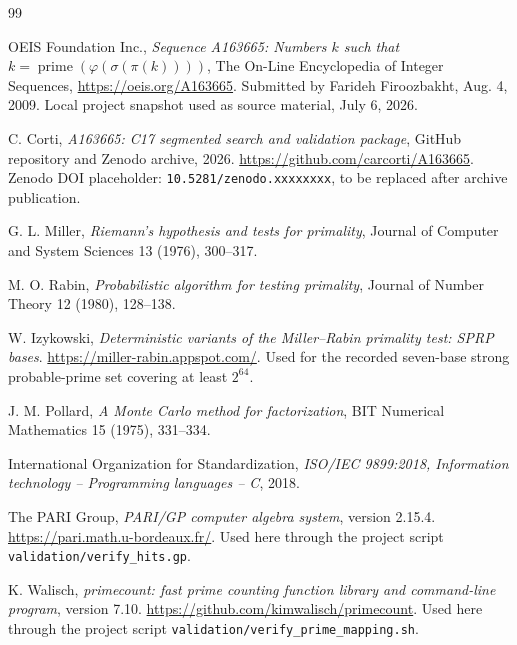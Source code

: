 \documentclass[11pt]{article}
\theoremstyle{definition}
\theoremstyle{remark}
\begin{document}
\begin{thebibliography}{99}
\sloppy
\raggedright

OEIS Foundation Inc.,
\emph{Sequence A163665: Numbers \(k\) such that
\(k=\operatorname{prime}(\varphi(\sigma(\pi(k))))\)},
The On-Line Encyclopedia of Integer Sequences,
\url{https://oeis.org/A163665}.
Submitted by Farideh Firoozbakht, Aug. 4, 2009.  Local project snapshot
used as source material, July 6, 2026.

C. Corti,
\emph{A163665: C17 segmented search and validation package},
GitHub repository and Zenodo archive, 2026.
\url{https://github.com/carcorti/A163665}.
Zenodo DOI placeholder: \texttt{10.5281/zenodo.xxxxxxxx}, to be
replaced after archive publication.

G. L. Miller,
\emph{Riemann's hypothesis and tests for primality},
Journal of Computer and System Sciences 13 (1976), 300--317.

M. O. Rabin,
\emph{Probabilistic algorithm for testing primality},
Journal of Number Theory 12 (1980), 128--138.

W. Izykowski,
\emph{Deterministic variants of the Miller--Rabin primality test:
SPRP bases}.
\url{https://miller-rabin.appspot.com/}.
Used for the recorded seven-base strong probable-prime set covering at
least \(2^{64}\).

J. M. Pollard,
\emph{A Monte Carlo method for factorization},
BIT Numerical Mathematics 15 (1975), 331--334.

International Organization for Standardization,
\emph{ISO/IEC 9899:2018, Information technology -- Programming languages -- C},
2018.

The PARI Group,
\emph{PARI/GP computer algebra system}, version 2.15.4.
\url{https://pari.math.u-bordeaux.fr/}.
Used here through the project script
\texttt{validation/verify\_hits.gp}.

K. Walisch,
\emph{primecount: fast prime counting function library and command-line
program}, version 7.10.
\url{https://github.com/kimwalisch/primecount}.
Used here through the project script
\texttt{validation/verify\_prime\_mapping.sh}.

\end{thebibliography}
\end{document}
